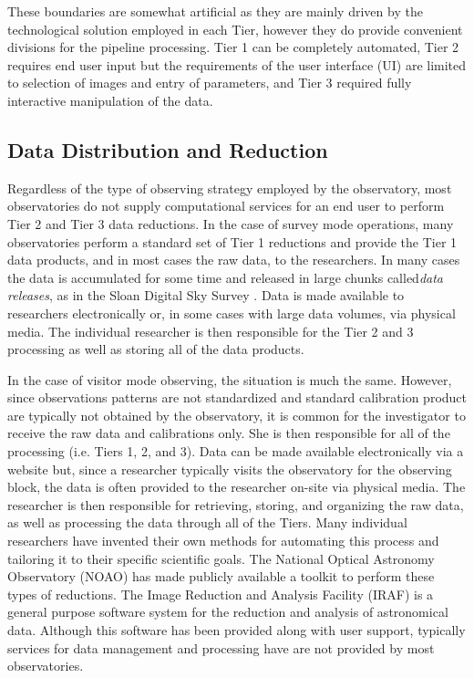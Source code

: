 \documentclass[10pt,conference]{IEEEtran}
\begin{document}
These boundaries are somewhat artificial as they are mainly driven by the technological solution employed in each Tier, however they do provide convenient divisions for the pipeline processing. Tier 1 can be completely automated, Tier 2 requires end user input but the requirements of the user interface (UI) are limited to selection of images and entry of parameters, and Tier 3 required fully interactive manipulation of the data. 

\subsection{Data Distribution and Reduction}\label{sec:reduction}

Regardless of the type of observing strategy employed by the observatory, most observatories do not supply computational services for an end user to perform Tier 2 and Tier 3 data reductions. In the case of survey mode operations, many observatories perform a standard set of Tier 1 reductions and provide the Tier 1 data products, and in most cases the raw data, to the researchers. In many cases the data is accumulated for some time and released in large chunks called{\it data releases}, as in the Sloan Digital Sky Survey \cite{york2000}. Data is made available to researchers electronically or, in some cases with large data volumes, via physical media. The individual researcher is then responsible for the Tier 2 and 3 processing as well as storing all of the data products.

In the case of visitor mode observing, the situation is much the same. However, since observations patterns are not standardized and standard calibration product are typically not obtained by the observatory, it is common for the investigator to receive the raw data and calibrations only. She is then responsible for all of the processing (i.e. Tiers 1, 2, and 3). Data can be made available electronically via a website but, since a researcher typically visits the observatory for the observing block, the data is often provided to the researcher on-site via physical media. The researcher is then responsible for retrieving, storing, and organizing the raw data, as well as processing the data through all of the Tiers. Many individual researchers have invented their own methods for automating this process and tailoring it to their specific scientific goals. The National Optical Astronomy Observatory (NOAO) has made publicly available a toolkit to perform these types of reductions. The Image Reduction and Analysis Facility (IRAF) is a general purpose software system for the reduction and analysis of astronomical data. Although this software has been provided along with user support, typically services for data management and processing have are not provided by most observatories. 
\end{document}
